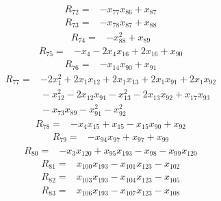 {\begin{align*}
\end{align*}
\begin{align*}
R_{72} ={}& -x_{77} x_{86} + x_{87}
\end{align*}
\begin{align*}
R_{73} ={}& -x_{78} x_{87} + x_{88}
\end{align*}
\begin{align*}
R_{74} ={}& -x_{88}^{2} + x_{89}
\end{align*}
\begin{align*}
R_{75} ={}& -x_{4} - 2x_{4} x_{16} + 2x_{16} + x_{90}
\end{align*}
\begin{align*}
R_{76} ={}& -x_{14} x_{90} + x_{91}
\end{align*}
\begin{align*}
R_{77} ={}& -2x_{1}^{2} + 2x_{1} x_{12} + 2x_{1} x_{13} + 2x_{1} x_{91} + 2x_{1} x_{92} \\
&{}  - x_{12}^{2} - 2x_{12} x_{91} - x_{13}^{2} - 2x_{13} x_{92} + x_{17} x_{93} \\
&{}  - x_{73} x_{89} - x_{91}^{2} - x_{92}^{2}
\end{align*}
\begin{align*}
R_{78} ={}& -x_{4} x_{15} + x_{15} - x_{15} x_{90} + x_{92}
\end{align*}
\begin{align*}
R_{79} ={}& -x_{94} x_{97} + x_{97} + x_{99}
\end{align*}
\begin{align*}
R_{80} ={}& -x_{3} x_{120} + x_{95} x_{193} - x_{98} - x_{99} x_{120}
\end{align*}
\begin{align*}
R_{81} ={}& x_{100} x_{193} - x_{101} x_{123} - x_{102}
\end{align*}
\begin{align*}
R_{82} ={}& x_{103} x_{193} - x_{104} x_{123} - x_{105}
\end{align*}
\begin{align*}
R_{83} ={}& x_{106} x_{193} - x_{107} x_{123} - x_{108}
\end{align*}
}
